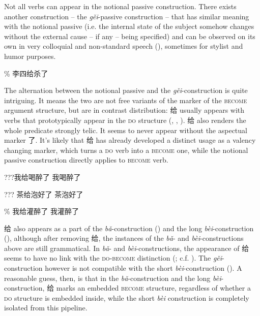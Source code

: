 \documentclass[UTF8, a4paper, oneside, scheme=plain, 12pt]{ctexrep}
\newcommand{\form}[1]{\emph{#1}}
\newcommand*{\category}[1]{\textsc{#1}}
\begin{document}
Not all verbs can appear in the notional passive construction.
There exists another construction -- the \form{gěi}-passive construction -- 
that has similar meaning with the notional passive
(i.e. the internal state of the subject somehow changes 
without the external cause -- if any -- being specified) and
can be observed on its own 
in very colloquial and non-standard speech
(),
sometimes for stylist and humor purposes.

\begin{exe}
    \ex\label{ex:verb-phrase.gei.1} \% 李四给杀了
\end{exe}

The alternation between the notional passive and the \form{gěi}-construction 
is quite intriguing.
It means the two are not free variants of the marker of the \category{become} argument structure,
but are in contrast distribution:
给 usually appears with verbs that prototypically appear in the \category{do} structure
(,
,
).
给 also renders the whole predicate strongly telic.
It seems to never appear without the aspectual marker 了.
It's likely that 给 has already developed a distinct usage 
as a valency changing marker, 
which turns a \category{do} verb into a \category{become} one,
while the notional passive construction directly applies to \category{become} verb.

\begin{exe}
    \ex\label{ex:verb-phrase.gei.alternation-1} \begin{xlist}
        \ex ???我给喝醉了
        \ex 我喝醉了
    \end{xlist}
    \ex\label{ex:verb-phrase.gei.alternation-2} \begin{xlist}
        \ex ??? 茶给泡好了
        \ex 茶泡好了
    \end{xlist}
    \ex\label{ex:verb-phrase.gei.alternation-3} \begin{xlist}
        \ex \% 我给灌醉了
        \ex *我灌醉了
    \end{xlist}
\end{exe}

给 also appears as a part of the \form{bǎ}-construction
()
and the long \form{bèi}-construction
(),
although after removing 给,
the instances of the \form{bǎ}- and \form{bèi}-constructions above 
are still grammatical.
In \form{bǎ}- and \form{bèi}-constructions, 
the appearance of 给 seems to have no link 
with the \category{do}-\category{become} distinction
(; c.f. ).
The \form{gěi}-construction however is not compatible 
with the short \form{bèi}-construction
().
A reasonable guess, then, 
is that in the \form{bǎ}-construction
and the long \form{bèi}-construction,
给 marks an embedded \category{become} structure,
regardless of whether a \category{do} structure is embedded inside,
while the short \form{bèi} construction is completely isolated 
from this pipeline.
\end{document}
